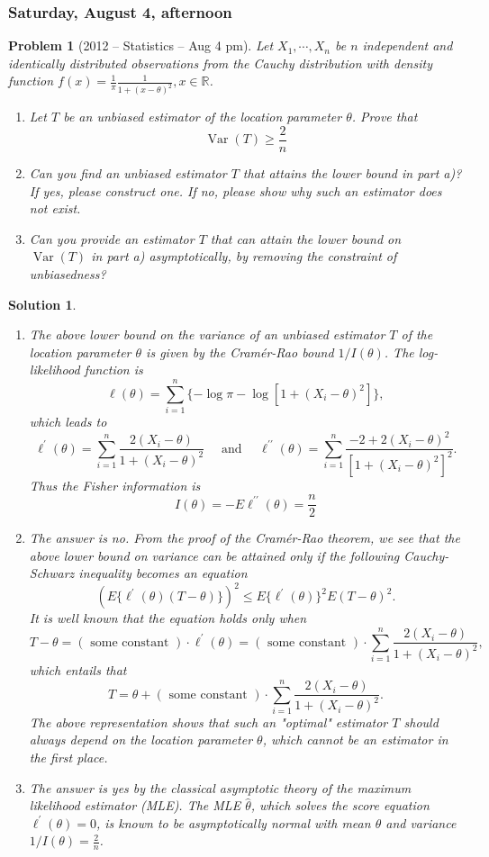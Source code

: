 \documentclass[12pt]{amsart}
\newtheorem{problem}{Problem}
\newtheorem*{solution}{Solution}
\begin{document}
\subsubsection*{Saturday, August 4, afternoon}
\begin{problem}[2012 -- Statistics -- Aug 4 pm]
Let $X_1, \cdots, X_n$ be $n$ independent and identically distributed observations from the Cauchy distribution with density function $f(x)=\frac{1}{\pi} \frac{1}{1+(x-\theta)^2}, x \in \mathbb{R}$.
\begin{enumerate}[label=\alph*)]
\item Let $T$ be an unbiased estimator of the location parameter $\theta$. Prove that
$$
\operatorname{Var}(T) \geq \frac{2}{n}
$$
\item Can you find an unbiased estimator $T$ that attains the lower bound in part a)? If yes, please construct one. If no, please show why such an estimator does not exist.
\item Can you provide an estimator $T$ that can attain the lower bound on $\operatorname{Var}(T)$ in part a) asymptotically, by removing the constraint of unbiasedness?
\end{enumerate}
\end{problem}
\begin{solution}
\begin{enumerate}[label=\alph*)]
\item The above lower bound on the variance of an unbiased estimator $T$ of the location parameter $\theta$ is given by the Cramér-Rao bound $1 / I(\theta)$. The log-likelihood function is
$$
\ell(\theta)=\sum_{i=1}^n\{-\log \pi-\log [1+(X_i-\theta)^2]\},
$$
which leads to
$$
\ell^{\prime}(\theta)=\sum_{i=1}^n \frac{2(X_i-\theta)}{1+(X_i-\theta)^2} \quad \text { and } \quad \ell^{\prime \prime}(\theta)=\sum_{i=1}^n \frac{-2+2(X_i-\theta)^2}{[1+(X_i-\theta)^2]^2} .
$$
Thus the Fisher information is
$$
I(\theta)=-E \ell^{\prime \prime}(\theta)=\frac{n}{2}
$$
\item The answer is no. From the proof of the Cramér-Rao theorem, we see that the above lower bound on variance can be attained only if the following Cauchy-Schwarz inequality becomes an equation
$$
(E\{\ell^{\prime}(\theta)(T-\theta)\})^2 \leq E\{\ell^{\prime}(\theta)\}^2 E(T-\theta)^2 .
$$
It is well known that the equation holds only when
$$
T-\theta=(\text { some constant }) \cdot \ell^{\prime}(\theta)=(\text { some constant }) \cdot \sum_{i=1}^n \frac{2(X_i-\theta)}{1+(X_i-\theta)^2},
$$
which entails that
$$
T=\theta+(\text { some constant }) \cdot \sum_{i=1}^n \frac{2(X_i-\theta)}{1+(X_i-\theta)^2} .
$$
The above representation shows that such an "optimal" estimator $T$ should always depend on the location parameter $\theta$, which cannot be an estimator in the first place.
\item The answer is yes by the classical asymptotic theory of the maximum likelihood estimator (MLE). The MLE $\hat{\theta}$, which solves the score equation $\ell^{\prime}(\theta)=0$, is known to be asymptotically normal with mean $\theta$ and variance $1 / I(\theta)=\frac{2}{n}$.
\end{enumerate}
\end{solution}
\end{document}
